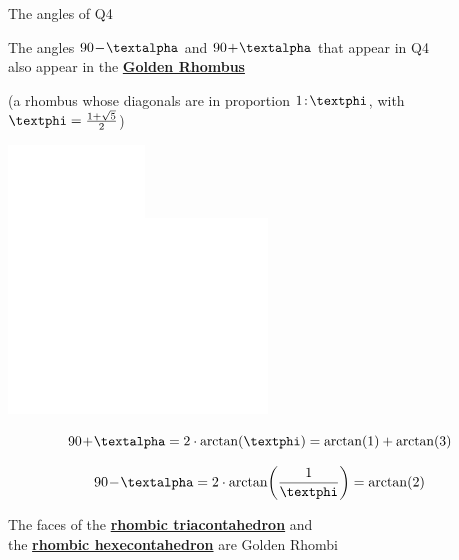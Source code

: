 \documentclass[14pt]{beamer}
\begin{document}

    \begin{frame}{The angles of Q4}
        \begin{center}
            The angles $90\!-\!\text{\textalpha}$ and $90\!+\!\text{\textalpha}$ that appear in Q4\\also appear in the \textbf{\href{https://en.wikipedia.org/wiki/Golden_rhombus}{Golden Rhombus}}

            \medskip

            {\footnotesize(a rhombus whose diagonals are in proportion $1\!:\!\text{\textphi}$, with $\text{\textphi} =\tfrac{1+\sqrt{5}}{2}$)}

            \bigskip

            \begin{minipage}{16ex}\vspace{2ex}
                \includegraphics[height=15ex]{figures/figure007a.pdf}\includegraphics[height=15ex]{figures/figure007b.pdf}\\
            \end{minipage}\quad\begin{minipage}{25ex}
                \footnotesize
                $$90\!+\!\text{\textalpha} = 2\cdot\arctan{\!\left(\text{\textphi}\right)} = \arctan{\!\left(1\right)} + \arctan{\!\left(3\right)}$$

                $$90\!-\!\text{\textalpha} = 2\cdot\arctan{\!\left(\frac{1}{\text{\textphi}}\right)} = \arctan{\!\left(2\right)}$$

                \bigskip
            \end{minipage}

            {\footnotesize The faces of the \textbf{\href{https://en.wikipedia.org/wiki/Rhombic_triacontahedron}{rhombic triacontahedron}} and\\the \textbf{\href{https://en.wikipedia.org/wiki/Rhombic_hexecontahedron}{rhombic hexecontahedron}} are Golden Rhombi}
        \end{center}
    \end{frame}
\end{document}
